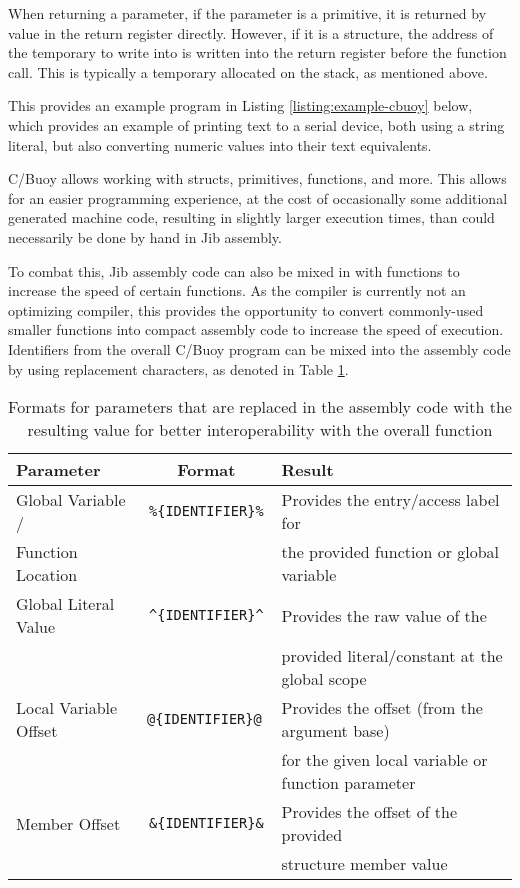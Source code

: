 \documentclass{article}
\begin{document}
When returning a parameter, if the parameter is a primitive, it is returned by value in the return register directly. However, if it is a structure, the address of the temporary to write into is written into the return register before the function call. This is typically a temporary allocated on the stack, as mentioned above.

This provides an example program in Listing \ref{listing:example-cbuoy} below, which provides an example of printing text to a serial device, both using a string literal, but also converting numeric values into their text equivalents.



C/Buoy allows working with structs, primitives, functions, and more. This allows for an easier programming experience, at the cost of occasionally some additional generated machine code, resulting in slightly larger execution times, than could necessarily be done by hand in Jib assembly.

To combat this, Jib assembly code can also be mixed in with functions to increase the speed of certain functions. As the compiler is currently not an optimizing compiler, this provides the opportunity to convert commonly-used smaller functions into compact assembly code to increase the speed of execution. Identifiers from the overall C/Buoy program can be mixed into the assembly code by using replacement characters, as denoted in Table \ref{table:cbuoy-assembly-mixin}.

\pagebreak

\begin{table}[h!]
    \centering
    \begin{tabular}{l|cl}
        \hline
        Parameter & Format & Result \\
        \hline
        Global Variable / & \texttt{\%\{IDENTIFIER\}\%} & Provides the entry/access label for \\ Function Location & & the provided function or global variable \\
        Global Literal Value & \texttt{\textasciicircum\{IDENTIFIER\}\textasciicircum} & Provides the raw value of the \\ & & provided literal/constant at the global scope \\
        Local Variable Offset & \texttt{@\{IDENTIFIER\}@ } & Provides the offset (from the argument base) \\ & & for the given local variable or function parameter \\
        Member Offset & \texttt{\&\{IDENTIFIER\}\&} & Provides the offset of the provided \\ & & structure member value \\
        \hline
    \end{tabular}
    \caption{Formats for parameters that are replaced in the assembly code with the resulting value for better interoperability with the overall function}
    \label{table:cbuoy-assembly-mixin}
\end{table}
\end{document}
